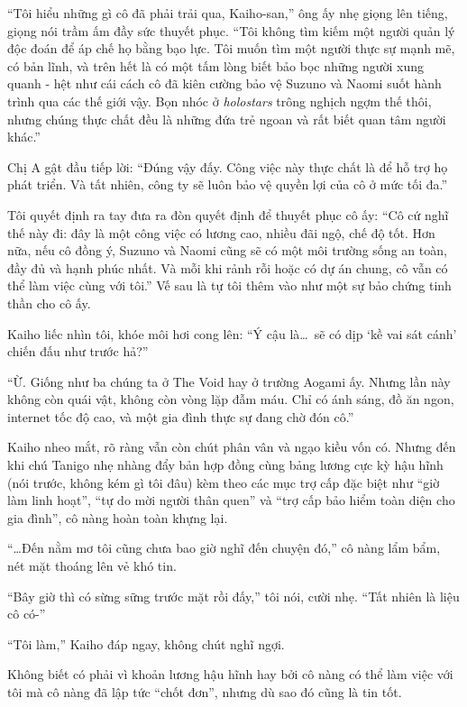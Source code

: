 \documentclass[../main.tex]{subfiles}
\begin{document}
``Tôi hiểu những gì cô đã phải trải qua, Kaiho-san,'' ông ấy nhẹ giọng lên tiếng, giọng nói trầm ấm đầy sức thuyết phục. ``Tôi không tìm kiếm một người quản lý độc đoán để áp chế họ bằng bạo lực. Tôi muốn tìm một người thực sự mạnh mẽ, có bản lĩnh, và trên hết là có một tấm lòng biết bảo bọc những người xung quanh - hệt như cái cách cô đã kiên cường bảo vệ Suzuno và Naomi suốt hành trình qua các thế giới vậy. Bọn nhóc ở \textit{holostars} trông nghịch ngợm thế thôi, nhưng chúng thực chất đều là những đứa trẻ ngoan và rất biết quan tâm người khác.''

Chị A gật đầu tiếp lời: ``Đúng vậy đấy. Công việc này thực chất là để hỗ trợ họ phát triển. Và tất nhiên, công ty sẽ luôn bảo vệ quyền lợi của cô ở mức tối đa.''

Tôi quyết định ra tay đưa ra đòn quyết định để thuyết phục cô ấy: ``Cô cứ nghĩ thế này đi: đây là một công việc có lương cao, nhiều đãi ngộ, chế độ tốt. Hơn nữa, nếu cô đồng ý, Suzuno và Naomi cũng sẽ có một môi trường sống an toàn, đầy đủ và hạnh phúc nhất. Và mỗi khi rảnh rỗi hoặc có dự án chung, cô vẫn có thể làm việc cùng với tôi.'' Vế sau là tự tôi thêm vào như một sự bảo chứng tinh thần cho cô ấy.

Kaiho liếc nhìn tôi, khóe môi hơi cong lên: ``Ý cậu là\dots\ sẽ có dịp `kề vai sát cánh' chiến đấu như trước hả?''

``Ừ. Giống như ba chúng ta ở The Void hay ở trường Aogami ấy. Nhưng lần này không còn quái vật, không còn vòng lặp đẫm máu. Chỉ có ánh sáng, đồ ăn ngon, internet tốc độ cao, và một gia đình thực sự đang chờ đón cô.''

Kaiho nheo mắt, rõ ràng vẫn còn chút phân vân và ngạo kiều vốn có. Nhưng đến khi chú Tanigo nhẹ nhàng đẩy bản hợp đồng cùng bảng lương cực kỳ hậu hĩnh (nói trước, không kém gì tôi đâu) kèm theo các mục trợ cấp đặc biệt như ``giờ làm linh hoạt'', ``tự do mời người thân quen'' và ``trợ cấp bảo hiểm toàn diện cho gia đình'', cô nàng hoàn toàn khựng lại.

``\dots Đến nằm mơ tôi cũng chưa bao giờ nghĩ đến chuyện đó,'' cô nàng lẩm bẩm, nét mặt thoáng lên vẻ khó tin.

``Bây giờ thì có sừng sững trước mặt rồi đấy,'' tôi nói, cười nhẹ. ``Tất nhiên là liệu cô có-''

``Tôi làm,'' Kaiho đáp ngay, không chút nghĩ ngợi.

Không biết có phải vì khoản lương hậu hĩnh hay bởi cô nàng có thể làm việc với tôi mà cô nàng đã lập tức ``chốt đơn'', nhưng dù sao đó cũng là tin tốt.
\end{document}
